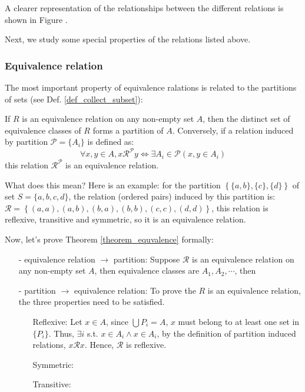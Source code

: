 A clearer representation of the relationships between the different relations is shown in Figure .

Next, we study some special properties of the relations listed above.

\subsubsection*{Equivalence relation}
The most important property of equivalence ralations is related to the partitions of sets (see Def. \ref{def_collect_subset}):
\begin{theorem}\label{theorem_equvalence}
    If $R$ is an equivalence relation on any non-empty set $A$, then the distinct set of equivalence classes of $R$ forms a partition of $A$.
    Conversely, if a relation induced by partition $\mathcal{P}=\{A_i\}$ is defined as:
    $$
    \forall x,y\in A, x\mathcal{R}^{\mathcal{P}}y \Leftrightarrow \exists A_i \in \mathcal{P}(x,y\in A_i)
    $$
    this relation $\mathcal{R}^{\mathcal{P}}$ is an equivalence relation.
\end{theorem}

What does this mean? Here is an example: for the partition $\left\{\{a,b\},\{c\},\{d\}\right\}$ of set $S=\{a,b,c,d\}$, the relation (ordered pairs) induced by this partition 
is: $\mathcal{R}=\left\{(a,a),(a,b),(b,a),(b,b),(c,c),(d,d)\right\}$, this relation is reflexive, transitive and symmetric, so it is an equivalence relation.

Now, let's prove Theorem \ref{theorem_equvalence} formally:
\begin{enumerate}
    \item[-] equivalence relation $\rightarrow$ partition:
    Suppose $\mathcal{R}$ is an equivalence relation on any non-empty set $A$, then equivalence classes are $A_1,A_2,\cdots$, then 
    \item[-] partition $\rightarrow$ equivalence relation:
    To prove the $R$ is an equivalence relation, the three properties need to be satisfied.
    \begin{enumerate}
        \item[Reflexive:] Let $x\in A$, since $\bigcup P_i=A$, $x$ must belong to at least one set in $\{P_i\}$. Thus, $\exists i$ s.t. $x\in A_i \wedge x\in A_i$, by the definition of partition induced relations, $x\mathcal{R}x$. Hence, $\mathcal{R}$ is reflexive.
        \item[Symmetric:]
        \item[Transitive:]   
    \end{enumerate}
\end{enumerate}